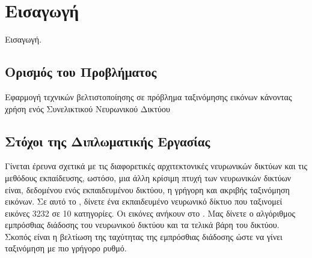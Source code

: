 \chapter{Εισαγωγή}

Εισαγωγή.\cite{zoi04}

\section{Ορισμός του Προβλήματος}
Εφαρμογή τεχνικών βελτιστοποίησης σε πρόβλημα ταξινόμησης εικόνων κάνοντας χρήση ενός Συνελικτικού Νευρωνικού Δικτύου \cite{cs61c}


\section{Στόχοι της Διπλωματικής Εργασίας}

Γίνεται έρευνα σχετικά με τις διαφορετικές αρχιτεκτονικές νευρωνικών δικτύων και τις μεθόδους εκπαίδευσης, ωστόσο, μια άλλη κρίσιμη πτυχή των νευρωνικών δικτύων είναι, δεδομένου ενός εκπαιδευμένου δικτύου, η γρήγορη και ακριβής ταξινόμηση εικόνων.
Σε αυτό το , δίνετε ένα εκπαιδευμένο νευρωνικό δίκτυο που ταξινομεί εικόνες 3232  σε 10 κατηγορίες. Οι εικόνες ανήκουν στο . Μας δίνετε ο αλγόριθμος εμπρόσθιας διάδοσης του νευρωνικού δικτύου και τα τελικά βάρη του δικτύου. Σκοπός είναι η βελτίωση της ταχύτητας της εμπρόσθιας διάδοσης ώστε να γίνει ταξινόμηση με πιο γρήγορο ρυθμό.
